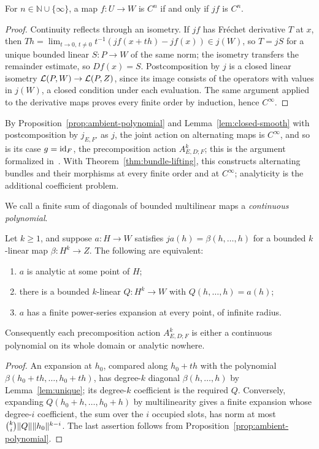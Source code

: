 \begin{lemma}\label{lem:closed-smooth}
For $n\in\mathbb N\cup\{\infty\}$, a map $f\colon U\to W$ is $C^n$ if and only if $jf$ is $C^n$.
\end{lemma}
\begin{proof}
Continuity reflects through an isometry. If $jf$ has Fr\'echet derivative $T$ at $x$, then $Th=\lim_{t\to0,\,t\ne0}t^{-1}(jf(x+th)-jf(x))\in j(W)$, so $T=jS$ for a unique bounded linear $S\colon P\to W$ of the same norm; the isometry transfers the remainder estimate, so $Df(x)=S$. Postcomposition by $j$ is a closed linear isometry $\mathcal L(P,W)\to\mathcal L(P,Z)$, since its image consists of the operators with values in $j(W)$, a closed condition under each evaluation. The same argument applied to the derivative maps proves every finite order by induction, hence $C^\infty$.
\end{proof}

By Proposition~\ref{prop:ambient-polynomial} and Lemma~\ref{lem:closed-smooth} with postcomposition by $j_{E,F'}$ as $j$, the joint action on alternating maps is $C^\infty$, and so is its case $g=\mathrm{id}_F$, the precomposition action $A^k_{E,D;F}$; this is the argument formalized in~\cite{PR}. With Theorem~\ref{thm:bundle-lifting}, this constructs alternating bundles and their morphisms at every finite order and at $C^\infty$; analyticity is the additional coefficient problem.

We call a finite sum of diagonals of bounded multilinear maps a \emph{continuous polynomial}.
\begin{proposition}\label{prop:homogeneous-lift}
Let $k\ge1$, and suppose $a\colon H\to W$ satisfies
$ja(h)=\beta(h,\ldots,h)$ for a bounded $k$-linear map $\beta\colon H^k\to Z$. The following are equivalent:
\begin{enumerate}
\item $a$ is analytic at some point of $H$;
\item there is a bounded $k$-linear $Q\colon H^k\to W$ with $Q(h,\ldots,h)=a(h)$;
\item $a$ has a finite power-series expansion at every point, of infinite radius.
\end{enumerate}
Consequently each precomposition action $A^k_{E,D;F}$ is either a continuous polynomial on its whole domain or analytic nowhere.
\end{proposition}
\begin{proof}
An expansion at $h_0$, compared along $h_0+th$ with the polynomial $\beta(h_0+th,\ldots,h_0+th)$, has degree-$k$ diagonal $\beta(h,\ldots,h)$ by Lemma~\ref{lem:unique}; its degree-$k$ coefficient is the required $Q$. Conversely, expanding $Q(h_0+h,\ldots,h_0+h)$ by multilinearity gives a finite expansion whose degree-$i$ coefficient, the sum over the $i$ occupied slots, has norm at most $\binom ki\lVert Q\rVert\lVert h_0\rVert^{k-i}$. The last assertion follows from Proposition~\ref{prop:ambient-polynomial}.
\end{proof}

